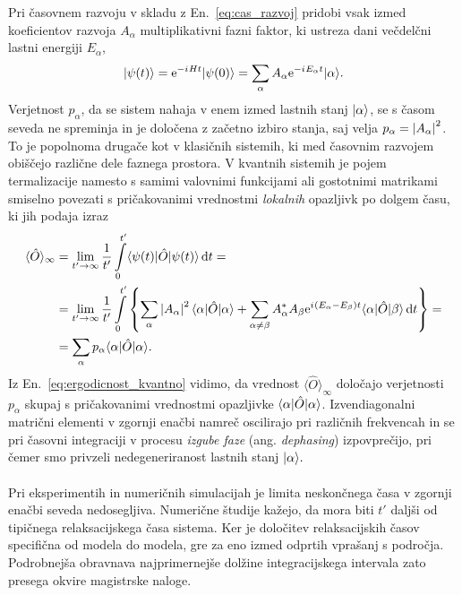  Pri časovnem razvoju v skladu z En.~\eqref{eq:cas_razvoj} pridobi vsak izmed koeficientov razvoja $A_\alpha$ multiplikativni fazni faktor, ki ustreza dani večdelčni lastni energiji $E_\alpha$, 
$$
\vert\psi(t)\rangle=\mathrm{e}^{-{i\mkern1mu} H t}\vert\psi(0)\rangle=\sum\limits_\alpha A_\alpha \mathrm{e}^{-{i\mkern1mu} E_\alpha t}\vert\alpha\rangle.
$$
Verjetnost $p_\alpha$, da se sistem nahaja v enem izmed lastnih stanj $\vert\alpha\rangle$, se s časom seveda ne spreminja in je določena z začetno izbiro stanja, saj velja $p_\alpha=\left| A_\alpha \right|^2$. To je popolnoma drugače kot v klasičnih sistemih, ki med časovnim razvojem obiščejo različne dele faznega prostora. V kvantnih sistemih je pojem termalizacije namesto s samimi valovnimi funkcijami	ali gostotnimi matrikami smiselno povezati  s pričakovanimi vrednostmi \emph{lokalnih} opazljivk po dolgem času, ki jih podaja izraz~\cite{deutsch1991quantum}~\cite{abanin2018ergodicity}
\begin{equation}\label{eq:ergodicnost_kvantno}
\begin{split}
\langle \hat{O}\rangle_\infty &=\lim_{t'\to\infty}\frac{1}{t'}\int\limits_0^{t'} \langle \psi(t) \vert\hat{O}\vert\psi(t)\rangle\,\mathrm{d} t =\\
&=\lim_{t'\to\infty}\frac{1}{t'}\int\limits_0^{t'}\left\{\sum\limits_\alpha\left| A_\alpha \right|^2\langle \alpha \vert\hat{O}\vert\alpha\rangle+        \sum\limits_{\alpha\neq\beta} A_\alpha^* A_\beta\mathrm{e}^{{i\mkern1mu}\left(E_\alpha-E_\beta\right)t} \langle \alpha \vert\hat{O}\vert\beta\rangle \,\mathrm{d} t\right\}=\\
 &=\sum\limits_\alpha p_\alpha\langle \alpha \vert\hat{O}\vert\alpha\rangle.
 \end{split}
\end{equation}
Iz En.~\eqref{eq:ergodicnost_kvantno} vidimo, da vrednost $\langle \hat{O}\rangle_\infty$ določajo verjetnosti $p_\alpha$ skupaj s pričakovanimi vrednostmi opazljivke $\langle \alpha \vert\hat{O}\vert\alpha\rangle$. Izvendiagonalni matrični elementi v zgornji enačbi namreč oscilirajo pri različnih frekvencah in se pri časovni integraciji v procesu \emph{izgube faze} (ang. \emph{dephasing}) izpovprečijo, pri čemer smo privzeli nedegeneriranost lastnih stanj $\vert\alpha\rangle.$ 
\\\\
Pri eksperimentih in numeričnih simulacijah je limita neskončnega časa v zgornji enačbi seveda nedosegljiva. Numerične študije kažejo, da mora biti $t'$ daljši od tipičnega relaksacijskega časa sistema. Ker je določitev relaksacijskih časov specifična od modela do modela, gre za eno izmed odprtih vprašanj s področja. Podrobnejša obravnava najprimernejše dolžine integracijskega intervala zato presega okvire magistrske naloge. 
